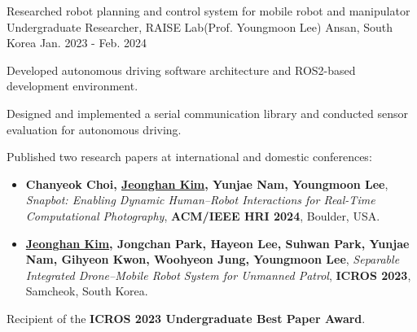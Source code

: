 \begin{cventries}
  \cventry
  {Researched robot planning and control system for mobile robot and manipulator} %
  {Undergraduate Researcher, RAISE Lab(Prof. Youngmoon Lee)} %
  {Ansan, South Korea} %
  {Jan. 2023 - Feb. 2024} %
  {
    \begin{cvitems}
      \item {Developed autonomous driving software architecture and ROS2-based development environment.}
      \item {Designed and implemented a serial communication library and conducted sensor evaluation for autonomous driving.}
      \item {Published two research papers at international and domestic conferences:}
      \begin{itemize}
        \item {\textbf{Chanyeok Choi, \underline{Jeonghan Kim}, Yunjae Nam, Youngmoon Lee}, \textit{Snapbot: Enabling Dynamic Human–Robot Interactions for Real-Time Computational Photography}, \textbf{ACM/IEEE HRI 2024}, Boulder, USA.}
        \item {\textbf{\underline{Jeonghan Kim}, Jongchan Park, Hayeon Lee, Suhwan Park, Yunjae Nam, Gihyeon Kwon, Woohyeon Jung, Youngmoon Lee}, \textit{Separable Integrated Drone–Mobile Robot System for Unmanned Patrol}, \textbf{ICROS 2023}, Samcheok, South Korea.}
      \end{itemize}
      \item {Recipient of the \textbf{ICROS 2023 Undergraduate Best Paper Award}.}
    \end{cvitems}
  }

\end{cventries}
